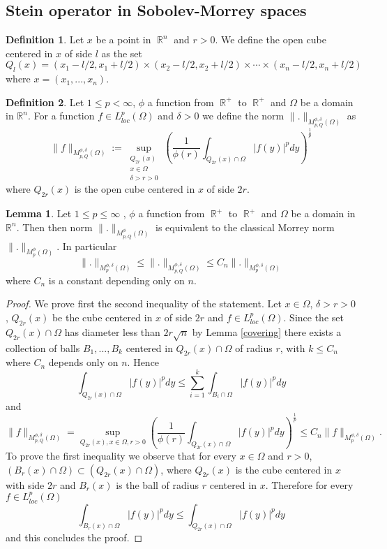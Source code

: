 \documentclass[12pt]{article}
\theoremstyle{definition}
\newtheorem{definition}{Definition}
\newtheorem{lemma}{Lemma}
\DeclareMathOperator\rr{\mathbb{R}}
\begin{document}
\subsection{Stein operator in Sobolev-Morrey spaces}

\begin{definition}
Let $x$ be a point in $\rr^n$ and $r>0$. We define the open cube centered in $x$ of side $l$ as the set 
\[ Q_l(x)=(x_1-l/2,x_1+l/2) \times (x_2-l/2,x_2+l/2) \times \cdots \times (x_n-l/2,x_n+l/2)   \]
where $x=(x_1,...,x_n).$
\end{definition}


\begin{definition}
Let $1\le p< \infty$, $\phi$ a function from $\rr^+$ to $\rr^+$ and $\Omega$ be a domain in $\mathbb{R}^n$. For a function $f \in L^p_{loc}(\Omega)$ and $\delta>0$ we define the norm $\| .\|_{M_{p,Q}^{\phi,\delta}(\Omega)}$ as
\[ \|f\|_{M_{p,Q}^{\phi,\delta}(\Omega)}:=\sup_{\substack{Q_{2r}(x) \\ x \in \Omega \\\delta>r>0}} \left(  \frac{1}{\phi(r)}\int_{Q_{2r}(x)\cap \Omega} |f(y)|^p dy \right )^{\frac{1}{p}}\]
where $Q_{2r}(x)$ is the open cube centered in $x$ of side $2r$.
\end{definition}
\begin{lemma}\label{cubicmorrey}
Let $1\le p\le \infty$ , $\phi$ a function from $\rr^+$ to $\rr^+$ and $\Omega$ be a domain in $\mathbb{R}^n$. Then then norm $\| .\|_{M_{p,Q}^\phi(\Omega)}$ is equivalent to the classical Morrey norm $\|.\|_{M_{p}^\phi(\Omega)}$. In particular 
\[ \| .\|_{M_{p}^{\phi,\delta}(\Omega)} \le \| .\|_{M_{p,Q}^{\phi,\delta}(\Omega)}\le C_{n}\| .\|_{M_{p}^{\phi,\delta}(\Omega)}\]
where $C_n$ is a constant depending only on $n.$
\end{lemma}

\begin{proof}
We prove first the second inequality of the statement. Let $x \in \Omega$, $\delta>r>0$, $Q_{2r}(x)$ be the cube centered in $x$ of side $2r$ and $f \in L^p_{loc}(\Omega)$. Since the set $Q_{2r}(x) \cap \Omega$ has diameter less than $2r\sqrt n$ by Lemma \ref{covering} there exists a collection of balls $B_1,...,B_k$ centered in $Q_{2r}(x) \cap \Omega$ of radius $r$, with $k\le C_n$ where $C_n$ depends only on $n.$ Hence 
\[ 	\int_{Q_{2r}(x)\cap\Omega} |f(y)|^p dy \le \sum_{i=1}^k \int_{B_i\cap\Omega} |f(y)|^p dy\]
and
\[ \| f\|_{M_{p,Q}^{\phi,\delta}(\Omega)}=\sup_{Q_{2r}(x) ,x \in \Omega,r>0} \left( \frac{1}{\phi(r)}\int_{Q_{2r}(x)\cap\Omega} |f(y)|^p dy \right)^{\frac{1}{p}} \le C_n \| f\|_{M_p^{\phi,\delta}(\Omega)}.\]
To prove the first inequality we observe that for every $x \in \Omega$ and $r>0$, $(B_r(x)\cap\Omega)\subset (Q_{2r}(x)\cap\Omega)$, where $Q_{2r}(x)$ is the cube centered in $x$ with side $2r$ and $B_r(x)$ is the ball of radius $r$ centered in $x$. Therefore for every $f \in L^p_{loc}(\Omega)$
\[ \int_{B_r(x)\cap\Omega} |f(y)|^p dy \le \int_{Q_{2r}(x)\cap\Omega} |f(y)|^p dy\]
and this concludes the proof.

\end{proof}
\end{document}
